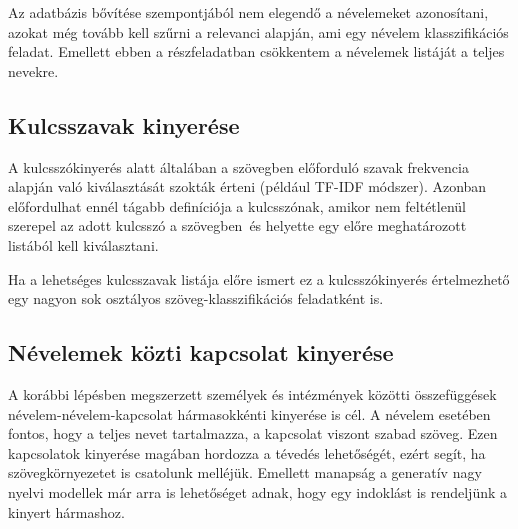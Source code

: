 Az adatbázis bővítése szempontjából nem elegendő a névelemeket azonosítani, azokat még tovább kell szűrni a relevanci alapján, ami egy névelem klasszifikációs feladat. Emellett ebben a részfeladatban csökkentem a névelemek listáját a teljes nevekre.

\subsection{Kulcsszavak kinyerése}

A kulcsszókinyerés alatt általában a szövegben előforduló szavak frekvencia alapján való kiválasztását szokták érteni (például TF-IDF módszer). Azonban előfordulhat ennél tágabb definíciója a kulcsszónak, amikor nem feltétlenül szerepel az adott kulcsszó a szövegben és helyette egy előre meghatározott listából kell kiválasztani.

Ha a lehetséges kulcsszavak listája előre ismert ez a kulcsszókinyerés értelmezhető egy nagyon sok osztályos szöveg-klasszifikációs feladatként is.

\subsection{Névelemek közti kapcsolat kinyerése}

A korábbi lépésben megszerzett személyek és intézmények közötti összefüggések névelem-névelem-kapcsolat hármasokkénti kinyerése is cél. A névelem esetében fontos, hogy a teljes nevet tartalmazza, a kapcsolat viszont szabad szöveg. Ezen kapcsolatok kinyerése magában hordozza a tévedés lehetőségét, ezért segít, ha szövegkörnyezetet is csatolunk melléjük. Emellett manapság a generatív nagy nyelvi modellek már arra is lehetőséget adnak, hogy egy indoklást is rendeljünk a kinyert hármashoz.

